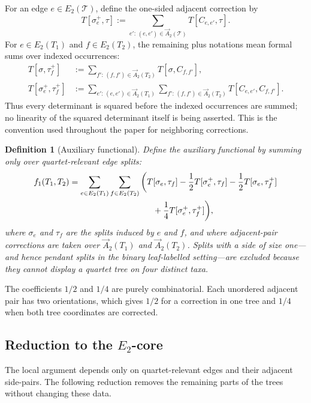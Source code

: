 \documentclass[11pt]{article}
\newtheorem{definition}[theorem]{Definition}
\begin{document}
For an edge $e\in E_2(\mathcal T)$, define the one-sided adjacent correction by
\[
T[\sigma_e^+,\tau]
:=\sum_{e':\,(e,e')\in\overrightarrow A_2(\mathcal T)}
T[C_{e,e'},\tau].
\]
For $e\in E_2(T_1)$ and $f\in E_2(T_2)$, the remaining plus notations mean
formal sums over indexed occurrences:
\[
\begin{aligned}
T[\sigma,\tau_f^+]
&:=\sum_{f':\,(f,f')\in\overrightarrow A_2(T_2)}
T[\sigma,C_{f,f'}],\\
T[\sigma_e^+,\tau_f^+]
&:=\sum_{e':\,(e,e')\in\overrightarrow A_2(T_1)}
\sum_{f':\,(f,f')\in\overrightarrow A_2(T_2)}
T[C_{e,e'},C_{f,f'}].
\end{aligned}
\]
Thus every determinant is squared before the indexed occurrences are summed;
no linearity of the squared determinant itself is being asserted.  This is the
convention used throughout the paper for neighboring corrections.

\begin{definition}[Auxiliary functional]
Define the auxiliary functional by summing only over quartet-relevant edge splits:
\[
\begin{aligned}
f_1(T_1,T_2)
&=
\sum_{e\in E_2(T_1)}\sum_{f\in E_2(T_2)}
\bigg(
T[\sigma_e,\tau_f]
-
\frac12T[\sigma_e^+,\tau_f]
-
\frac12T[\sigma_e,\tau_f^+]\\
&\hspace{3.5cm}
+
\frac14T[\sigma_e^+,\tau_f^+]
\bigg),
\end{aligned}
\]
where $\sigma_e$ and $\tau_f$ are the splits induced by $e$ and $f$, and
where adjacent-pair corrections are taken over
$\overrightarrow A_2(T_1)$ and $\overrightarrow A_2(T_2)$.  Splits with a
side of size one---and hence pendant splits in the binary leaf-labelled
setting---are excluded because they cannot display a quartet tree on four
distinct taxa.
\end{definition}

The coefficients $1/2$ and $1/4$ are purely combinatorial.  Each unordered adjacent pair has two
orientations, which gives $1/2$ for a correction in one tree and $1/4$ when
both tree coordinates are corrected.

\subsection[Reduction to the E2-core]{Reduction to the $E_2$-core}

The local argument depends only on quartet-relevant edges and their adjacent
side-pairs.  The following reduction removes the remaining parts of the trees
without changing these data.
\end{document}
